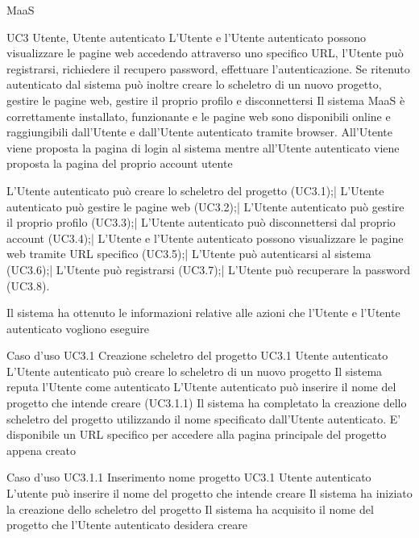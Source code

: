 
{MaaS}

\UC
{UC3}
{Utente, Utente autenticato}
{L'Utente e l'Utente autenticato possono visualizzare le pagine web accedendo attraverso uno specifico URL, l'Utente può registrarsi, richiedere il recupero password, effettuare l'autenticazione. Se ritenuto autenticato dal sistema può inoltre creare lo scheletro di un nuovo progetto, gestire le pagine web, gestire il proprio profilo e disconnettersi}
{Il sistema MaaS è correttamente installato, funzionante e le pagine web sono disponibili online e raggiungibili dall'Utente e dall'Utente autenticato tramite browser. All'Utente viene proposta la pagina di login al sistema mentre all'Utente autenticato viene proposta la pagina del proprio account utente}

\scenario
{L'Utente autenticato può creare lo scheletro del progetto (UC3.1);|
L'Utente autenticato può  gestire le pagine web (UC3.2);|
L'Utente autenticato può  gestire il proprio profilo (UC3.3);|
L'Utente autenticato può  disconnettersi dal proprio account (UC3.4);|
L'Utente e l'Utente autenticato possono visualizzare le pagine web tramite URL specifico (UC3.5);|
L'Utente può autenticarsi al sistema (UC3.6);|
L'Utente può registrarsi (UC3.7);|
L'Utente può recuperare la password (UC3.8).
}

\post
{Il sistema ha ottenuto le informazioni relative alle azioni che l'Utente e l'Utente autenticato vogliono eseguire}


\UCtitle
{Caso d'uso UC3.1}
{Creazione scheletro del progetto}
\UC
{UC3.1}
{Utente autenticato}
{L'Utente autenticato può creare lo scheletro di un nuovo progetto}
{Il sistema reputa l'Utente come autenticato}
\scenario
{L'Utente autenticato può inserire il nome del progetto che intende creare (UC3.1.1)}
\post
{Il sistema ha completato la creazione dello scheletro del progetto utilizzando il nome specificato dall'Utente autenticato. E' disponibile un URL specifico per accedere alla pagina principale del progetto appena creato}

\UCtitle
{Caso d'uso UC3.1.1}
{Inserimento nome progetto}
\UC
{UC3.1}
{Utente autenticato}
{L'utente può inserire il nome del progetto che intende creare}
{Il sistema ha iniziato la creazione dello scheletro del progetto}
\post
{Il sistema ha acquisito il nome del progetto che l'Utente autenticato desidera creare}

